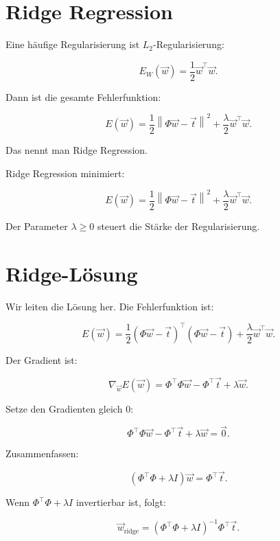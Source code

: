 \section{Ridge Regression}

Eine häufige Regularisierung ist \(L_2\)-Regularisierung:

\[
    E_W(\vec{w})
    =
    \frac{1}{2}
    \vec{w}^{\top}\vec{w}.
\]

Dann ist die gesamte Fehlerfunktion:

\[
    E(\vec{w})
    =
    \frac{1}{2}
    \left\|
        \Phi\vec{w}-\vec{t}
    \right\|^2
    +
    \frac{\lambda}{2}
    \vec{w}^{\top}\vec{w}.
\]

Das nennt man Ridge Regression.

\begin{definitionbox}
Ridge Regression minimiert:

\[
    E(\vec{w})
    =
    \frac{1}{2}
    \left\|
        \Phi\vec{w}-\vec{t}
    \right\|^2
    +
    \frac{\lambda}{2}
    \vec{w}^{\top}\vec{w}.
\]

Der Parameter \(\lambda \geq 0\) steuert die Stärke der Regularisierung.
\end{definitionbox}

\section{Ridge-Lösung}

Wir leiten die Lösung her.
Die Fehlerfunktion ist:

\[
    E(\vec{w})
    =
    \frac{1}{2}
    (\Phi\vec{w}-\vec{t})^{\top}
    (\Phi\vec{w}-\vec{t})
    +
    \frac{\lambda}{2}
    \vec{w}^{\top}\vec{w}.
\]

Der Gradient ist:

\[
    \nabla_{\vec{w}}E(\vec{w})
    =
    \Phi^{\top}\Phi\vec{w}
    -
    \Phi^{\top}\vec{t}
    +
    \lambda\vec{w}.
\]

Setze den Gradienten gleich \(0\):

\[
    \Phi^{\top}\Phi\vec{w}
    -
    \Phi^{\top}\vec{t}
    +
    \lambda\vec{w}
    =
    \vec{0}.
\]

Zusammenfassen:

\[
    (\Phi^{\top}\Phi+\lambda I)\vec{w}
    =
    \Phi^{\top}\vec{t}.
\]

Wenn \(\Phi^{\top}\Phi+\lambda I\) invertierbar ist, folgt:

\[
    \vec{w}_{\mathrm{ridge}}
    =
    (\Phi^{\top}\Phi+\lambda I)^{-1}
    \Phi^{\top}\vec{t}.
\]

